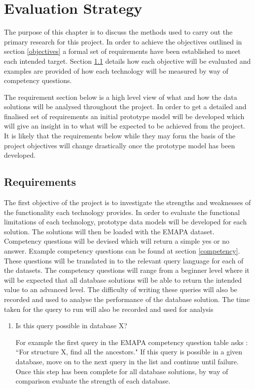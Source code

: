 \chapter{Evaluation Strategy}\label{evaluationstrategy}
The purpose of this chapter is to discuss the methods used to carry out the primary research for this project. In order to achieve the objectives outlined in section \ref{objectives} a formal set of requirements have been established to meet each intended target. Section \ref{requirements} details how each objective will be evaluated and examples are provided of how each technology will be measured by way of competency questions.

The requirement section below is a high level view of what and how the data solutions will be analysed throughout the project. In order to get a detailed and finalised set of requirements an initial prototype model will be developed which will give an insight in to what will be expected to be achieved from the project. It is likely that the requirements below while they may form the basis of the project objectives will change drastically once the prototype model has been developed.

\section{Requirements}\label{requirements}

The first objective of the project is to investigate the strengths and weaknesses of the functionality each technology provides. In order to evaluate the functional limitations of each technology, prototype data models will be developed for each solution. The solutions will then be loaded with the EMAPA dataset. Competency questions will be devised which will return a simple yes or no answer. Example competency questions can be found at section \ref{competency}. These questions will be translated in to the relevant query language for each of the datasets. The competency questions will range from a beginner level where it will be expected that all database solutions will be able to return the intended value to an advanced level. The difficulty of writing these queries will also be recorded and used to analyse the performance of the database solution. The time taken for the query to run will also be recorded and used for analysis

\begin{enumerate}
\item Is this query possible in database X?

For example the first query in the EMAPA competency question table asks : ``For structure X, find all the ancestors." If this query is possible in a given database, move on to the next query in the list and continue until failure. Once this step has been complete for all database solutions, by way of comparison evaluate the strength of each database.
\end{enumerate}

